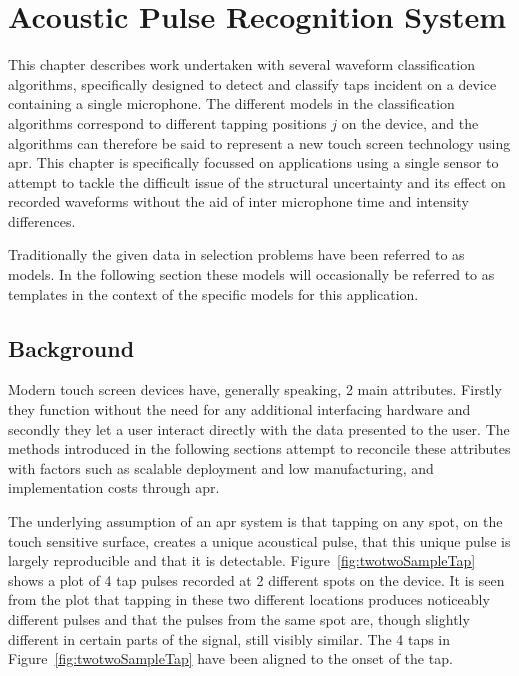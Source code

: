 \chapter{Acoustic Pulse Recognition System}\label{ch:APR}

\ifpdf
    \graphicspath{{Chapter3_APR/Chapter3Figs/PNG/}{Chapter3_APR/Chapter3Figs/PDF/}{Chapter3_APR/Chapter3Figs/}{Chapter3_APR/Chapter3Figs/PDF/}{Chapter3_APR/Chapter3Figs/Kamplitude/}}
\else
    \graphicspath{{Chapter3_APR/Chapter3Figs/EPS/}{Chapter3_APR/Chapter3Figs/}}
\fi

This chapter describes work undertaken with several waveform classification algorithms, specifically designed to detect and classify taps incident on a device containing a single microphone. The different models in the classification algorithms correspond to different tapping positions $j$ on the device, and the algorithms can therefore be said to represent a new touch screen technology using \gls{apr}. This chapter is specifically focussed on applications using a single sensor to attempt to tackle the difficult issue of the structural uncertainty and its effect on recorded waveforms without the aid of inter microphone time and intensity differences.

Traditionally the given data in selection problems have been referred to as models. In the following section these models will occasionally be referred to as templates in the context of the specific models for this application.

\section{Background}
Modern touch screen devices have, generally speaking, 2 main attributes. Firstly they function without the need for any additional interfacing hardware and secondly they let a user interact directly with the data presented to the user. The methods introduced in the following sections attempt to reconcile these attributes with factors such as scalable deployment and low manufacturing, and implementation costs through \gls{apr}.

The underlying assumption of an \gls{apr} system is that tapping on any spot, on the touch sensitive surface, creates a unique acoustical pulse, that this unique pulse is largely reproducible and that it is detectable. Figure~\ref{fig:twotwoSampleTap} shows a plot of 4 tap pulses recorded at 2 different spots on the device. It is seen from the plot that tapping in these two different locations produces noticeably different pulses and that the pulses from the same spot are, though slightly different in certain parts of the signal, still visibly similar. The 4 taps in Figure~\ref{fig:twotwoSampleTap} have been aligned to the onset of the tap.

